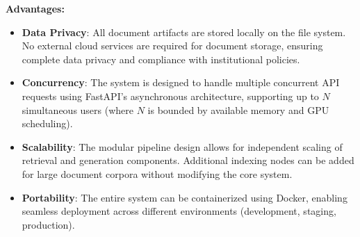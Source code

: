 \textbf{Advantages:}
\begin{itemize}
    \item \textbf{Data Privacy}: All document artifacts are stored locally on the file system. No external cloud services are required for document storage, ensuring complete data privacy and compliance with institutional policies.
    \item \textbf{Concurrency}: The system is designed to handle multiple concurrent API requests using FastAPI's asynchronous architecture, supporting up to $N$ simultaneous users (where $N$ is bounded by available memory and GPU scheduling).
    \item \textbf{Scalability}: The modular pipeline design allows for independent scaling of retrieval and generation components. Additional indexing nodes can be added for large document corpora without modifying the core system.
    \item \textbf{Portability}: The entire system can be containerized using Docker, enabling seamless deployment across different environments (development, staging, production).
\end{itemize}

